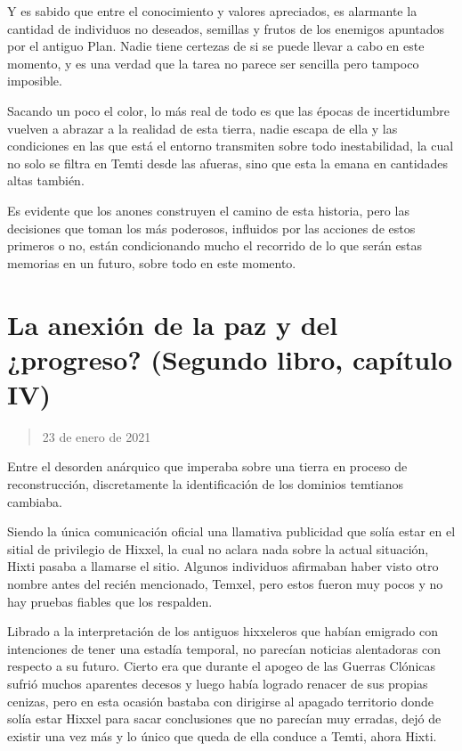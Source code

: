 \documentclass[
  spanish,
]{book}
\begin{document}
Y es sabido que entre el conocimiento y valores apreciados, es alarmante la cantidad de individuos no deseados, semillas y frutos de los enemigos apuntados por el antiguo Plan. Nadie tiene certezas de si se puede llevar a cabo en este momento, y es una verdad que la tarea no parece ser sencilla pero tampoco imposible.

Sacando un poco el color, lo más real de todo es que las épocas de incertidumbre vuelven a abrazar a la realidad de esta tierra, nadie escapa de ella y las condiciones en las que está el entorno transmiten sobre todo inestabilidad, la cual no solo se filtra en Temti desde las afueras, sino que esta la emana en cantidades altas también.

Es evidente que los anones construyen el camino de esta historia, pero las decisiones que toman los más poderosos, influidos por las acciones de estos primeros o no, están condicionando mucho el recorrido de lo que serán estas memorias en un futuro, sobre todo en este momento.

\hypertarget{la-anexiuxf3n-de-la-paz-y-del-progreso-segundo-libro-capuxedtulo-iv}{%
\section{La anexión de la paz y del ¿progreso? (Segundo libro, capítulo IV)}\label{la-anexiuxf3n-de-la-paz-y-del-progreso-segundo-libro-capuxedtulo-iv}}

\begin{quote}
23 de enero de 2021
\end{quote}

Entre el desorden anárquico que imperaba sobre una tierra en proceso de reconstrucción, discretamente la identificación de los dominios temtianos cambiaba.

Siendo la única comunicación oficial una llamativa publicidad que solía estar en el sitial de privilegio de Hixxel, la cual no aclara nada sobre la actual situación, Hixti pasaba a llamarse el sitio. Algunos individuos afirmaban haber visto otro nombre antes del recién mencionado, Temxel, pero estos fueron muy pocos y no hay pruebas fiables que los respalden.

Librado a la interpretación de los antiguos hixxeleros que habían emigrado con intenciones de tener una estadía temporal, no parecían noticias alentadoras con respecto a su futuro. Cierto era que durante el apogeo de las Guerras Clónicas sufrió muchos aparentes decesos y luego había logrado renacer de sus propias cenizas, pero en esta ocasión bastaba con dirigirse al apagado territorio donde solía estar Hixxel para sacar conclusiones que no parecían muy erradas, dejó de existir una vez más y lo único que queda de ella conduce a Temti, ahora Hixti.
\end{document}
